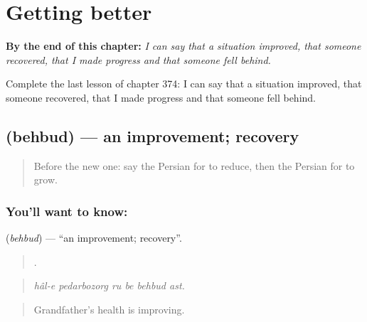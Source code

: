 
\chapter{Getting better}
\label{ch:fa-getting-better}

\begin{chapteropening}
\textbf{By the end of this chapter:} \emph{I can say that a situation improved, that someone recovered, that I made progress and that someone fell behind.}

Complete the last lesson of chapter 374: I can say that a situation improved, that someone recovered, that I made progress and that someone fell behind.
\end{chapteropening}

\section[\texorpdfstring{\fa{بهبود} (behbud)}{بهبود (behbud)}]{ (behbud) — an improvement; recovery}

\label{lesson:FA-C374-behbud}



\begin{quote}
Before the new one: say the Persian for to reduce, then the Persian for to grow.
\end{quote}

\subsection*{You'll want to know: }
\textbf{} (\emph{behbud}) — \textquotedblleft{}an improvement; recovery\textquotedblright{}.

\begin{quote}
     .
\end{quote}

\begin{quote}
\emph{hâl-e pedarbozorg ru be behbud ast.}
\end{quote}

\begin{quote}
Grandfather's health is improving.
\end{quote}


